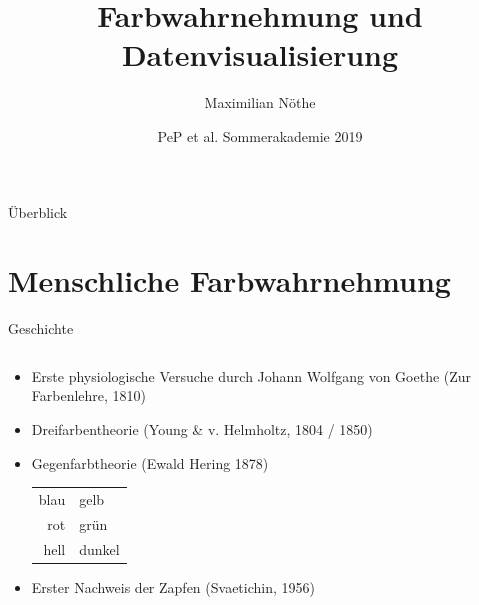 \documentclass[aspectratio=1610, 9pt]{beamer}
\title{Farbwahrnehmung und Datenvisualisierung}
\author[maxnoe]{Maximilian Nöthe}
\date[SoAk19]{PeP et al. Sommerakademie 2019}
\institute{PeP et Al.}
\begin{document}
\maketitle

\begin{frame}[t]{Überblick}
  \tableofcontents
\end{frame}

\section{Menschliche Farbwahrnehmung}

\begin{frame}[c]{Geschichte}
  \begin{columns}[onlytextwidth]
    \hfill
    \begin{column}{0.59\textwidth}
      \begin{itemize}
        \item Erste physiologische Versuche durch Johann Wolfgang von Goethe (Zur Farbenlehre, 1810) \\
        \item Dreifarbentheorie (Young \& v. Helmholtz, 1804 / 1850)
        \item Gegenfarbtheorie (Ewald Hering 1878) \\
          \begin{tabular}{r @{${}⟷  {}$} l}
            blau & gelb \\
            rot & grün \\
            hell & dunkel \\
          \end{tabular}
        \item Erster Nachweis der Zapfen (Svaetichin, 1956) 
      \end{itemize}
    \end{column}
    \hfill%
    \begin{column}{0.39\textwidth}
      \hfill%
      \vfill%
      \centering
\end{column}
\end{columns}
\end{frame}
\end{document}
